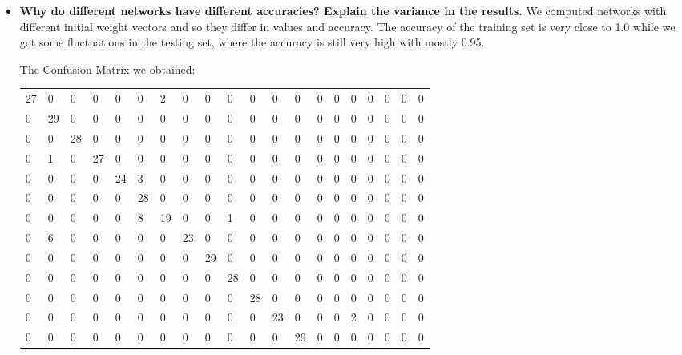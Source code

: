 \documentclass[a4paper]{article}
\begin{document}
\begin{itemize}
\item \textbf{Why do different networks have different accuracies? Explain the variance in the results.}
\newline \newline
We computed networks with different initial weight vectors and so they differ in values and accuracy.
The accuracy of the training set is very close to 1.0 while we got some fluctuations in the testing set, where the accuracy is still very high with mostly 0.95.

\newpage

The Confusion Matrix we obtained: \\
\begin{table}[ht]
\centering
\label{my-label}
\begin{tabular}{llllllllllllllllllll}
27 & 0  & 0  & 0  & 0  & 0  & 2  & 0  & 0  & 0  & 0  & 0  & 0  & 0  & 0  & 0  & 0  & 0  & 0  & 0  \\
0  & 29 & 0  & 0  & 0  & 0  & 0  & 0  & 0  & 0  & 0  & 0  & 0  & 0  & 0  & 0  & 0  & 0  & 0  & 0  \\
0  & 0  & 28 & 0  & 0  & 0  & 0  & 0  & 0  & 0  & 0  & 0  & 0  & 0  & 0  & 0  & 0  & 0  & 0  & 0  \\
0  & 1  & 0  & 27 & 0  & 0  & 0  & 0  & 0  & 0  & 0  & 0  & 0  & 0  & 0  & 0  & 0  & 0  & 0  & 0  \\
0  & 0  & 0  & 0  & 24 & 3  & 0  & 0  & 0  & 0  & 0  & 0  & 0  & 0  & 0  & 0  & 0  & 0  & 0  & 0  \\
0  & 0  & 0  & 0  & 0  & 28 & 0  & 0  & 0  & 0  & 0  & 0  & 0  & 0  & 0  & 0  & 0  & 0  & 0  & 0  \\
0  & 0  & 0  & 0  & 0  & 8  & 19 & 0  & 0  & 1  & 0  & 0  & 0  & 0  & 0  & 0  & 0  & 0  & 0  & 0  \\
0  & 6  & 0  & 0  & 0  & 0  & 0  & 23 & 0  & 0  & 0  & 0  & 0  & 0  & 0  & 0  & 0  & 0  & 0  & 0  \\
0  & 0  & 0  & 0  & 0  & 0  & 0  & 0  & 29 & 0  & 0  & 0  & 0  & 0  & 0  & 0  & 0  & 0  & 0  & 0  \\
0  & 0  & 0  & 0  & 0  & 0  & 0  & 0  & 0  & 28 & 0  & 0  & 0  & 0  & 0  & 0  & 0  & 0  & 0  & 0  \\
0  & 0  & 0  & 0  & 0  & 0  & 0  & 0  & 0  & 0  & 28 & 0  & 0  & 0  & 0  & 0  & 0  & 0  & 0  & 0  \\
0  & 0  & 0  & 0  & 0  & 0  & 0  & 0  & 0  & 0  & 0  & 23 & 0  & 0  & 0  & 2  & 0  & 0  & 0  & 0  \\
0  & 0  & 0  & 0  & 0  & 0  & 0  & 0  & 0  & 0  & 0  & 0  & 29 & 0  & 0  & 0  & 0  & 0  & 0  & 0  \\

\end{tabular}
\end{table}
\end{itemize}
\end{document}
